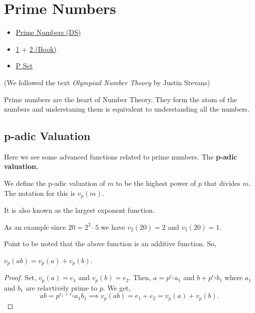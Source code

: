\chapter{Prime Numbers}%

\begin{linkb}
   \begin{itemize}
        \item \href{https://www.youtube.com/watch?v=rPwHbwGOY3g}{Prime Numbers (DS)}
        \item \href{https://drive.google.com/file/d/1nNdAErPUd7Qb7AP6xEruPmnuQth8V7r-/view?usp=sharing}{1} + 
			\href{https://drive.google.com/file/d/1_s160_QGQXZUB9OJ1joou13TMVMoKMaE/view?usp=sharing}{2 (Book)}
			
		\item \href{https://drive.google.com/file/d/1vSGKVVaqVSZAYcWxXzIwzLstpvVKwJUy/view}{P Set}
   \end{itemize}
\end{linkb}

(We followed the text \textit{Olympiad Number Theory} by Justin Stevans)

Prime numbers are the heart of Number Theory. They form the atom of the numbers and understaning them is equivalent to understanding all the numbers.


\section{p-adic Valuation}
Here we see some advanced functions related to prime numbers. The \textbf{p-adic valuation.}
\begin{definition}
We define the p-adic valuation of $m$ to be the highest power of $p$ that divides $m$. The notation for this is $v_p(m)$.
\end{definition}
It is also known as the largest exponent function.

As an example since $20 = 2^2 \cdot 5$ we have $v_2 (20) = 2$ and $v_5 (20) = 1$.

Point to be noted that the above function is an additive function.
So,
\begin{theorem}
$v_p(ab)=v_p(a)+v_p(b)$.
\end{theorem}
\begin{proof}
Set, $v_p(a)=e_1$ and $v_p(b)=e_2$. Then, 
$a=p^{e_1}a_1$ and $b+p^{e_2}b_1$ where 
$a_1$ and $b_1$ are relavtively prime to $p$. We get,
\[ab = p^{e_1+e_2}a_1b_1 \implies v_p(ab)=e_1+e_2=v_p(a)+v_p(b).\]
\end{proof}

